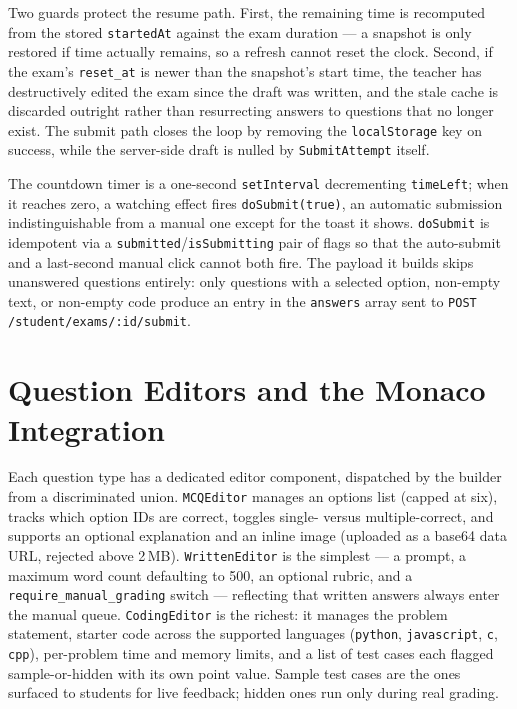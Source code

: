 Two guards protect the resume path. First, the remaining time is recomputed
from the stored \texttt{startedAt} against the exam duration --- a snapshot is
only restored if time actually remains, so a refresh cannot reset the clock.
Second, if the exam's \texttt{reset\_at} is newer than the snapshot's start
time, the teacher has destructively edited the exam since the draft was written,
and the stale cache is discarded outright rather than resurrecting answers to
questions that no longer exist. The submit path closes the loop by removing the
\texttt{localStorage} key on success, while the server-side draft is nulled by
\texttt{SubmitAttempt} itself.

The countdown timer is a one-second \texttt{setInterval} decrementing
\texttt{timeLeft}; when it reaches zero, a watching effect fires
\texttt{doSubmit(true)}, an automatic submission indistinguishable from a manual
one except for the toast it shows. \texttt{doSubmit} is idempotent via a
\texttt{submitted}/\texttt{isSubmitting} pair of flags so that the auto-submit
and a last-second manual click cannot both fire. The payload it builds skips
unanswered questions entirely: only questions with a selected option, non-empty
text, or non-empty code produce an entry in the \texttt{answers} array sent to
\texttt{POST /student/exams/:id/submit}.

\section{Question Editors and the Monaco Integration}

Each question type has a dedicated editor component, dispatched by the builder
from a discriminated union. \texttt{MCQEditor} manages an options list (capped
at six), tracks which option IDs are correct, toggles single- versus
multiple-correct, and supports an optional explanation and an inline image
(uploaded as a base64 data URL, rejected above 2\,MB).
\texttt{WrittenEditor} is the simplest --- a prompt, a maximum word count
defaulting to 500, an optional rubric, and a \texttt{require\_manual\_grading}
switch --- reflecting that written answers always enter the manual queue.
\texttt{CodingEditor} is the richest: it manages the problem statement, starter
code across the supported languages (\texttt{python}, \texttt{javascript},
\texttt{c}, \texttt{cpp}), per-problem time and memory limits, and a list of
test cases each flagged sample-or-hidden with its own point value. Sample test
cases are the ones surfaced to students for live feedback; hidden ones run only
during real grading.

